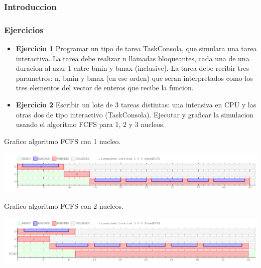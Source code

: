 
\subsubsection{Introduccion}

\subsubsection{Ejercicios}
\begin{itemize}
 \item \textbf{Ejercicio 1 } Programar un tipo de tarea TaskConsola, que simulara una tarea interactiva.
La tarea debe realizar n llamadas bloqueantes, cada una de una duracion al azar 1 entre bmin
y bmax (inclusive). La tarea debe recibir tres parametros: n, bmin y bmax (en ese orden) que
seran interpretados como los tres elementos del vector de enteros que recibe la funcion.
\item \textbf{Ejercicio 2} Escribir un lote de 3 tareas distintas: una intensiva en CPU y las otras dos de
tipo interactivo (TaskConsola). Ejecutar y graficar la simulacion usando el algoritmo FCFS
para 1, 2 y 3 nucleos.
\end{itemize}

Grafico algoritmo FCFS con 1 nucleo.
\vspace*{0.3cm} \vspace*{0.3cm}
  \begin{center}
 \includegraphics[scale=0.5]{ejercicio2-1nucleo.png}
 \end{center}
  \vspace*{0.3cm}

  Grafico algoritmo FCFS con 2 nucleos.
\vspace*{0.3cm} \vspace*{0.3cm}
  \begin{center}
 \includegraphics[scale=0.5]{ejercicio2-2nucleo.png}
 \end{center}
  \vspace*{0.3cm}

